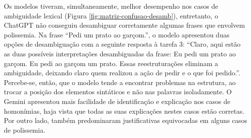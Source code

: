 Os modelos tiveram, simultaneamente, melhor desempenho nos casos de ambiguidade lexical (Figura \ref{fig:matriz-confusao-desamb}), entretanto, o ChatGPT não conseguiu desambiguar corretamente algumas frases que envolvem polissemia. Na frase \enquote{Pedi um prato ao garçom.}, o modelo apresentou duas opções de desambiguação com a seguinte resposta à tarefa 3: \enquote{Claro, aqui estão as duas possíveis interpretações desambiguadas da frase:  Eu pedi um prato ao garçom.  Eu pedi ao garçom um prato. Essas reestruturações eliminam a ambiguidade, deixando claro quem realizou a ação de pedir e o que foi pedido.}. Percebe-se, então, que o modelo tende a encontrar problemas na estrutura, ao trocar a posição dos elementos sintáticos e não nas palavras isoladamente. O Gemini apresentou mais facilidade de identificação e explicação nos casos de homonímias, haja vista que todas as suas explicações nestes casos estão corretas. Por outro lado, também predominaram justificativas equivocadas em alguns casos de polissemia.
